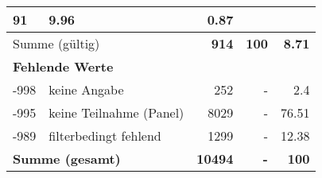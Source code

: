 \begin{longtable}{lXrrr}
       \num{91} &
       \num[round-mode=places,round-precision=2]{9,96} &
         \num[round-mode=places,round-precision=2]{0,87} \\
     \midrule
     \multicolumn{2}{l}{Summe (gültig)} &
       \textbf{\num{914}} &
     \textbf{100} &
       \textbf{\num[round-mode=places,round-precision=2]{8,71}} \\
     \multicolumn{5}{l}{\textbf{Fehlende Werte}}\\
       -998 &
       keine Angabe &
         \num{252} &
        - &
         \num[round-mode=places,round-precision=2]{2,4} \\
       -995 &
       keine Teilnahme (Panel) &
         \num{8029} &
        - &
         \num[round-mode=places,round-precision=2]{76,51} \\
       -989 &
       filterbedingt fehlend &
         \num{1299} &
        - &
         \num[round-mode=places,round-precision=2]{12,38} \\
     \midrule
     \multicolumn{2}{l}{\textbf{Summe (gesamt)}} &
          \textbf{\num{10494}} &
        \textbf{-} &
        \textbf{100} \\
     \bottomrule
     \end{longtable}
     
